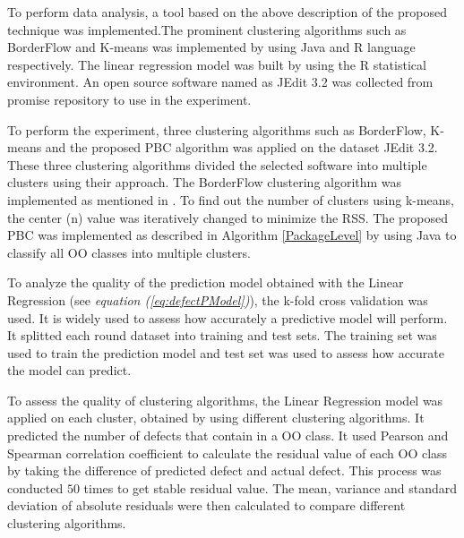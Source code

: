 \documentclass[12pt]{report}
\begin{document}
To perform data analysis, a tool based on the above description of the proposed technique was implemented.The prominent clustering algorithms such as BorderFlow and K-means was implemented by using Java and R language respectively. The linear regression model was built by using the R statistical environment. An open source software named as JEdit 3.2 was collected from promise repository \cite{promise12} to use in the experiment.

To perform the experiment, three clustering algorithms such as BorderFlow, K-means and the proposed PBC algorithm was applied on the dataset JEdit 3.2. These three clustering algorithms divided the selected software into multiple clusters using their approach. The BorderFlow clustering algorithm was implemented as mentioned in \cite{scanniello2013class}. To find out the number of clusters using k-means, the center (n) value was iteratively changed to minimize the RSS. The proposed PBC was implemented as described in Algorithm \ref{PackageLevel} by using Java to classify all OO classes into multiple clusters.

%

To analyze the quality of the prediction model obtained with the Linear Regression (see \textit{equation (\ref{eq:defectPModel})}), the k-fold cross validation was used. It is widely used to assess how accurately a predictive model will perform. It splitted each round dataset into training and test sets. The training set was used to train the prediction model and test set was used to assess how accurate the model can predict. 
 
To assess the quality of clustering algorithms, the Linear Regression model was applied on each cluster, obtained by using different clustering algorithms. It predicted the number of defects that contain in a OO class. It used Pearson and Spearman correlation coefficient to calculate the residual value of each OO class by taking the difference of predicted defect and actual defect. This process was conducted $50$ times to get stable residual value. The mean, variance and standard deviation of absolute residuals were then calculated to compare different clustering algorithms.
\end{document}
